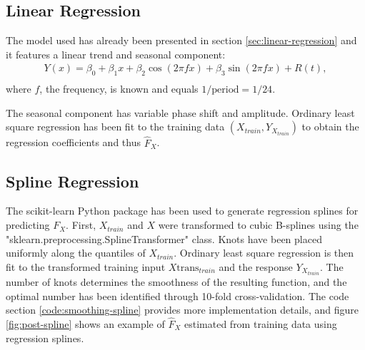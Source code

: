 \subsection{Linear Regression}

The model used has already been presented in section \ref{sec:linear-regression} and
it features a linear trend and seasonal component:
\begin{gather*}
Y(x) = \beta_0 + \beta_1 x + \beta_2 \cos(2 \pi f x) + \beta_3 \sin(2 \pi f x) + R(t), \\
\end{gather*}
where $f$, the frequency, is known and equals $1/\text{period} = 1/24$.

The seasonal component has variable phase shift and amplitude.
Ordinary least square regression has been fit to the training data
$(X_{train}, Y_{X_{train}})$ to obtain the regression coefficients and thus
$\hat{F}_X$.
%

\subsection{Spline Regression}

The scikit-learn Python package has been used to
generate regression splines for predicting $F_X$.
First, $X_{train}$ and $X$ were transformed to cubic B-splines using the \\
"sklearn.preprocessing.SplineTransformer" class.
Knots have been placed uniformly along the quantiles of $X_{train}$.
Ordinary least square regression is then fit to the transformed training
input $X\text{trans}_{train}$ and the response $Y_{X_{train}}$.
The number of knots determines the smoothness of the resulting function,
and the optimal number has been identified through 10-fold
cross-validation.
The code section \ref{code:smoothing-spline} provides more implementation details,
and figure \ref{fig:post-spline} shows an example of $\hat{F}_X$ estimated
from training data using regression splines.

